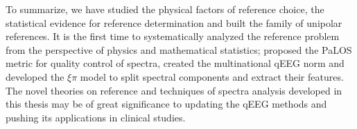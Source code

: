 \begin{englishabstract}
To summarize, we have studied the physical factors of reference choice, the statistical evidence for reference determination and built the family of unipolar references. It is the first time to systematically analyzed the reference problem from the perspective of physics and mathematical statistics; proposed the PaLOS metric for quality control of spectra, created the multinational qEEG norm and developed the $\xi\pi$ model to split spectral components and extract their features. The novel theories on reference and techniques of spectra analysis developed in this thesis may be of great significance to updating the qEEG methods and pushing its applications in clinical studies.

\end{englishabstract}